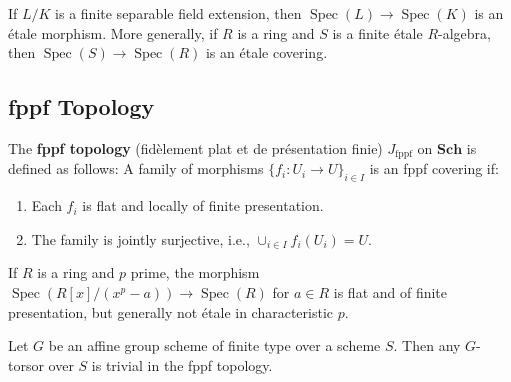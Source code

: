\documentclass[12pt]{article}
\begin{document}
\begin{example}
    If $L/K$ is a finite separable field extension, then $\operatorname{Spec}(L) \to \operatorname{Spec}(K)$ is an étale morphism. More generally, if $R$ is a ring and $S$ is a finite étale $R$-algebra, then $\operatorname{Spec}(S) \to \operatorname{Spec}(R)$ is an étale covering.
\end{example}

\subsection{fppf Topology}

\begin{definition}
    The \textbf{fppf topology} (fidèlement plat et de présentation finie) $J_{\textrm{fppf}}$ on $\mathbf{Sch}$ is defined as follows: A family of morphisms $\{f_i: U_i \to U\}_{i \in I}$ is an fppf covering if:
    \begin{enumerate}
        \item Each $f_i$ is flat and locally of finite presentation.
        \item The family is jointly surjective, i.e., $\cup_{i \in I} f_i(U_i) = U$.
    \end{enumerate}
\end{definition}

\begin{example}
    If $R$ is a ring and $p$ prime, the morphism $\operatorname{Spec}(R[x]/(x^p-a)) \to \operatorname{Spec}(R)$ for $a \in R$ is flat and of finite presentation, but generally not étale in characteristic $p$.
\end{example}

\begin{theorem}[Grothendieck]
    Let $G$ be an affine group scheme of finite type over a scheme $S$. Then any $G$-torsor over $S$ is trivial in the fppf topology.
\end{theorem}
\end{document}
